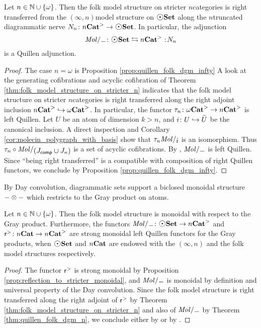 \begin{thm}\label{thm:quillen_folk_dgm_n}
    Let \( n \in \mathbb{N} \cup \left\{ {\omega} \right\} \).
    Then the folk model structure on stricter \( n \)\nbd categories is right transferred from the \( (\infty, n) \)\nbd model structure on \( \dgmSet \) along the \( n \)\nbd truncated diagrammatic nerve \( \N{n} \colon \snCat{n} \to \dgmSet \).
    In particular, the adjunction 
    \begin{equation*}
        \molecin{-} \colon \dgmSet \leftrightarrows \snCat{n} \cocolon \N{n}
    \end{equation*}
    is a Quillen adjunction.
\end{thm}
\begin{proof}
    The case \( n = \omega \) is Proposition \ref{prop:quillen_folk_dgm_infty}
    A look at the generating cofibrations and acyclic cofibration of Theorem \ref{thm:folk_model_structure_on_stricter_n} indicates that the folk model structure on stricter \( n \)\nbd categories is right transferred along the right adjoint inclusion \( {n\mathbf{Cat}}^> \hookrightarrow {\omega\mathbf{Cat}}^> \).  
    In particular, the functor \( \tau_{n} \colon {\omega\mathbf{Cat}}^> \to {n\mathbf{Cat}}^> \) is left Quillen.
    Let \( U \) be an atom of dimension \( k > n \), and \( i \colon U \hookrightarrow \widetilde{U} \) be the canonical inclusion.
    A direct inspection and Corollary \ref{cor:molecin_polygraph_with_basis} show that \( \trunc{n}\molecin{i} \) is an isomorphism.
    Thus \( \trunc{n} \after \molecin{(\Jcomp \cup \Jn{n})} \) is a set of acyclic cofibrations.
    By \cite[E.2.14]{joyal2008theory}, \( \molecin{-} \) is left Quillen. 
    Since ``being right transferred'' is a compatible with composition of right Quillen functors, we conclude by Proposition \ref{prop:quillen_folk_dgm_infty}.
\end{proof}

\noindent By Day convolution, diagrammatic sets support a biclosed monoidal structure \( - \otimes - \) which restricts to the Gray product on atoms.

\begin{prop} \label{prop:Gray_monoidal}
    Let \( n \in \mathbb{N} \cup \left\{ {\omega} \right\} \).
    Then the folk model structure is monoidal with respect to the Gray product.
    Furthermore, the functors \( \molecin{-} \colon \dgmSet \to \snCat{n} \) and \( \mathsf{r}^{>} \colon {n\mathbf{Cat}} \to {n\mathbf{Cat}}^> \) are strong monoidal left Quillen functors for the Gray products, when \( \dgmSet \) and \( {n\mathbf{Cat}} \) are endowed with the \( (\infty, n) \) and the folk model structures respectively.
\end{prop}
\begin{proof}
    The functor \( \mathsf{r}^{>} \) is strong monoidal by Proposition \ref{prop:reflection_to_stricter_monoidal}, and \( \molecin{-} \) is monoidal by definition and universal property of the Day convolution.
    Since the folk model structure is right transferred along the right adjoint of \( \mathsf{r}^{>} \) by Theorem \ref{thm:folk_model_structure_on_stricter_n} and also of \( \molecin{-} \) by Theorem \ref{thm:quillen_folk_dgm_n}, we conclude either by \cite[Theorem 5.6]{ara2020monoidal} or by \cite[Theorem 5.10]{chanavat2025gray}.
\end{proof}